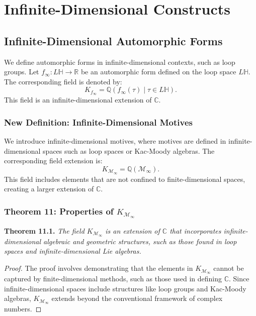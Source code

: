 \documentclass{article}
\begin{document}
\section{Infinite-Dimensional Constructs}
\subsection{Infinite-Dimensional Automorphic Forms}
We define automorphic forms in infinite-dimensional contexts, such as loop groups. Let \(f_{\infty}: L\mathbb{H} \to \mathbb{R}\) be an automorphic form defined on the loop space \(L\mathbb{H}\). The corresponding field is denoted by:
\[
K_{f_{\infty}} = \mathbb{Q}(f_{\infty}(\tau) \mid \tau \in L\mathbb{H}).
\]
This field is an infinite-dimensional extension of \(\mathbb{C}\).

\subsubsection{New Definition: Infinite-Dimensional Motives}
We introduce infinite-dimensional motives, where motives are defined in infinite-dimensional spaces such as loop spaces or Kac-Moody algebras. The corresponding field extension is:
\[
K_{\mathcal{M}_{\infty}} = \mathbb{Q}(\mathcal{M}_{\infty}).
\]
This field includes elements that are not confined to finite-dimensional spaces, creating a larger extension of \(\mathbb{C}\).

\subsubsection{Theorem 11: Properties of \(K_{\mathcal{M}_{\infty}}\)}
\textbf{Theorem 11.1.} \textit{The field \(K_{\mathcal{M}_{\infty}}\) is an extension of \(\mathbb{C}\) that incorporates infinite-dimensional algebraic and geometric structures, such as those found in loop spaces and infinite-dimensional Lie algebras.}

\begin{proof}
The proof involves demonstrating that the elements in \(K_{\mathcal{M}_{\infty}}\) cannot be captured by finite-dimensional methods, such as those used in defining \(\mathbb{C}\). Since infinite-dimensional spaces include structures like loop groups and Kac-Moody algebras, \(K_{\mathcal{M}_{\infty}}\) extends beyond the conventional framework of complex numbers.
\end{proof}
\end{document}
